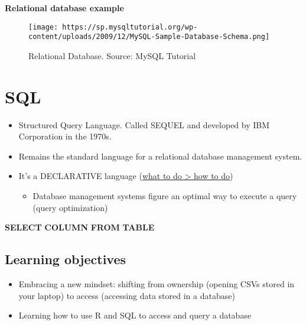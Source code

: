 \documentclass[
]{book}
\newenvironment{Shaded}{\begin{snugshade}}{\end{snugshade}}
\newcommand{\KeywordTok}[1]{\textcolor[rgb]{0.13,0.29,0.53}{\textbf{#1}}}
\providecommand{\tightlist}{%
  \setlength{\itemsep}{0pt}\setlength{\parskip}{0pt}}
\begin{document}
\textbf{Relational database example}

\begin{figure}
\centering
\texttt{[image: https://sp.mysqltutorial.org/wp-content/uploads/2009/12/MySQL-Sample-Database-Schema.png]}
\caption{Relational Database. Source: MySQL Tutorial}
\end{figure}

\hypertarget{sql}{%
\section{SQL}\label{sql}}

\begin{itemize}
\item
  Structured Query Language. Called SEQUEL and developed by IBM Corporation in the 1970s.
\item
  Remains the standard language for a relational database management system.
\item
  It's a DECLARATIVE language (\href{https://www.sqlite.org/queryplanner.html}{what to do \textgreater{} how to do})

  \begin{itemize}
  \tightlist
  \item
    Database management systems figure an optimal way to execute a query (query optimization)
  \end{itemize}
\end{itemize}

\begin{Shaded}
\begin{Highlighting}[]
\KeywordTok{SELECT} \KeywordTok{COLUMN} \KeywordTok{FROM} \KeywordTok{TABLE} 
\end{Highlighting}
\end{Shaded}

\hypertarget{learning-objectives-1}{%
\subsection{Learning objectives}\label{learning-objectives-1}}

\begin{itemize}
\item
  Embracing a new mindset: shifting from ownership (opening CSVs stored in your laptop) to access (accessing data stored in a database)
\item
  Learning how to use R and SQL to access and query a database
\end{itemize}
\end{document}
